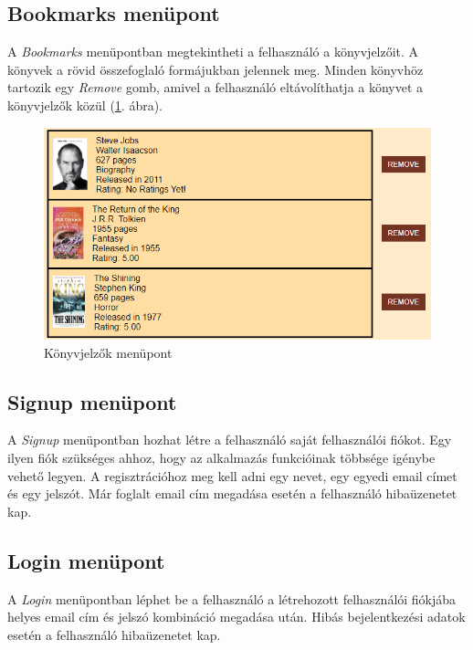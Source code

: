 \subsection{Bookmarks menüpont}

A \textit{Bookmarks} menüpontban megtekintheti a felhasználó a könyvjelzőit. A könyvek a rövid összefoglaló formájukban jelennek meg. Minden könyvhöz tartozik egy \textit{Remove} gomb, amivel a felhasználó eltávolíthatja a könyvet a könyvjelzők közül (\ref{fig:bookmarks}. ábra).

\begin{figure}[h]
    \centering
    \includegraphics[scale=0.65]{images/application/bookmarks.png}
    \caption{Könyvjelzők menüpont}
    \label{fig:bookmarks}
\end{figure}

\subsection{Signup menüpont}

A \textit{Signup} menüpontban hozhat létre a felhasználó saját felhasználói fiókot. Egy ilyen fiók szükséges ahhoz, hogy az alkalmazás funkcióinak többsége igénybe vehető legyen. A regisztrációhoz meg kell adni egy nevet, egy egyedi email címet és egy jelszót. Már foglalt email cím megadása esetén a felhasználó hibaüzenetet kap.

\subsection{Login menüpont}

A \textit{Login} menüpontban léphet be a felhasználó a létrehozott felhasználói fiókjába helyes email cím és jelszó kombináció megadása után. Hibás bejelentkezési adatok esetén a felhasználó hibaüzenetet kap.

